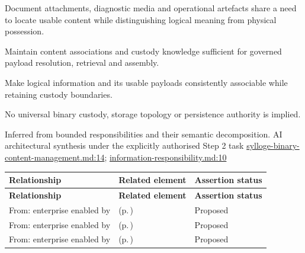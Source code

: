 Document attachments, diagnostic media and operational artefacts share a need to locate usable content while distinguishing logical meaning from physical possession.



Maintain content associations and custody knowledge sufficient for governed payload resolution, retrieval and assembly.



Make logical information and its usable payloads consistently associable while retaining custody boundaries.



No universal binary custody, storage topology or persistence authority is implied.


Inferred from bounded responsibilities and their semantic decomposition. AI architectural synthesis under the explicitly authorised Step 2 task \hyperref[evidence:0c75887c024354f6]{sylloge-binary-content-management.md:14}; \hyperref[evidence:be61392fefb4bb10]{information-responsibility.md:10}
\begingroup\small\setlength{\TableWidth}{\dimexpr\linewidth-6\tabcolsep-4\arrayrulewidth\relax}
\begin{longtable}{|>{\raggedright\arraybackslash}p{0.27\TableWidth}|>{\raggedright\arraybackslash}p{0.48\TableWidth}|>{\raggedright\arraybackslash}p{0.25\TableWidth}|}
\hline\rowcolor{TableHead}\textbf{Relationship} & \textbf{Related element} & \textbf{Assertion status}\\\hline\endfirsthead
\hline\rowcolor{TableHead}\textbf{Relationship} & \textbf{Related element} & \textbf{Assertion status}\\\hline\endhead
\hline\endfoot
From: enterprise enabled by & \nameref{cap:bec-associated-clinical-binary-content-enablement} (p.\,\pageref{cap:bec-associated-clinical-binary-content-enablement}) & Proposed\\\hline
From: enterprise enabled by & \nameref{cap:bec-clinical-record-administration} (p.\,\pageref{cap:bec-clinical-record-administration}) & Proposed\\\hline
From: enterprise enabled by & \nameref{cap:bec-clinical-collaboration} (p.\,\pageref{cap:bec-clinical-collaboration}) & Proposed\\\hline
\end{longtable}\endgroup

